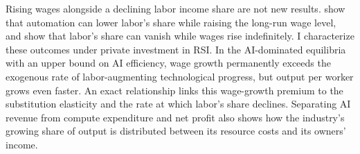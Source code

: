 Rising wages alongside a declining labor income share are not new results.
\citet{acemoglurestrepo2018} show that automation can lower labor's share
while raising the long-run wage level, and \citet{raymookherjee2022} show
that labor's share can vanish while wages rise indefinitely. I characterize
these outcomes under private investment in RSI. In the AI-dominated
equilibria with an upper bound on AI efficiency, wage growth permanently
exceeds the exogenous rate of labor-augmenting technological progress, but
output per worker grows even faster. An exact relationship links this
wage-growth premium to the substitution elasticity and the rate at which
labor's share declines. Separating AI revenue from compute expenditure and
net profit also shows how the industry's growing share of output is
distributed between its resource costs and its owners' income.
